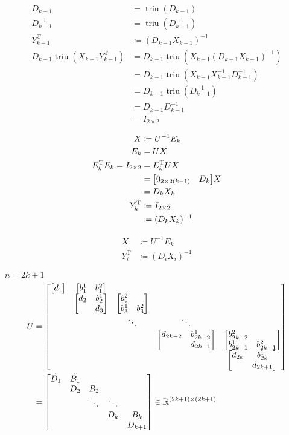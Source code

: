 \documentclass[11pt]{article}
\newcommand{\triu}{\mathop{\mathrm{triu}}}
\newcommand{\T}{\mathrm{T}}
\begin{document}
\begin{align*}
    D_{k-1} &= \triu(D_{k-1})\\
    D_{k-1}^{-1} &= \triu(D_{k-1}^{-1})\\
    Y_{k-1}^{\T} &\coloneqq (D_{k-1} X_{k-1})^{-1}\\
    D_{k-1} \triu(X_{k-1}Y_{k-1}^{\T}) &= D_{k-1} \triu(X_{k-1}(D_{k-1} X_{k-1})^{-1})\\
        &= D_{k-1} \triu(X_{k-1} X_{k-1}^{-1} D_{k-1}^{-1})\\
        &= D_{k-1} \triu(D_{k-1}^{-1})\\
        &= D_{k-1} D_{k-1}^{-1}\\
        &= I_{2 \times 2}
\end{align*}


\begin{align*}
    X &\coloneqq U^{-1} E_k\\
    E_{k} &= U X \\
    E_{k}^{\T} E_{k} = I_{2 \times 2} &= E_{k}^{\T} U X \\
        &= \mqty[
            0_{2 \times 2(k-1)} & D_{k}
        ] X \\
        &= D_{k} X_{k} \\
    Y_{k}^{\T} &\coloneqq I_{2 \times 2} \\
        &\coloneqq (D_{k} X_{k})^{-1}
\end{align*}

\begin{align*}
    X &\coloneqq U^{-1} E_{k} \\
    Y_{i}^{\T} &\coloneqq (D_{i} X_{i})^{-1}
\end{align*}









\newpage
$n = 2k + 1$
\begin{align*}
    U &= \mqty[
        \mqty[d_{1}] & \mqty[b^{1}_{1} & b^{2}_{1}] &   &   &  \\
          & \mqty[d_{2} & b^{1}_{2} \\ & d_{3}] & \mqty[b^{2}_{2} & \\ b^{1}_{3} & b^{2}_{3}] &   &  \\
          &   & \ddots & \ddots &  \\
          &   &   & \mqty[d_{2k-2} & b^{1}_{2k-2} \\ & d_{2k-1}] & \mqty[b^{2}_{2k-2} & \\ b^{1}_{2k-1} & b^{2}_{2k-1}] \\
          &   &   &   & \mqty[d_{2k} & b^{1}_{2k}\\ & d_{2k+1}]
    ]\\
    &= \mqty[
        \tilde{D_{1}} & \tilde{B_{1}} &   &   &  \\
          & D_{2} & B_{2} &   &  \\
          &   & \ddots & \ddots &  \\
          &   &   & D_{k} & B_{k}\\
          &   &   &   & D_{k+1}
    ] \in \mathbb{R}^{(2k+1) \times (2k+1)}
\end{align*}
\end{document}
